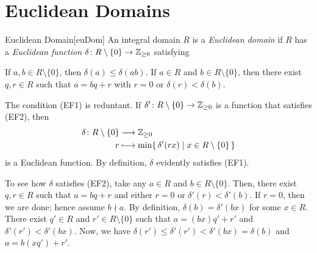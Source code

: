 \documentclass[../modern_algebra_2.tex]{subfiles}
\begin{document}
\section{Euclidean Domains}

\begin{Definition}{Euclidean Domain}[euDom]
    An integral domain \(R\) is a \emph{Euclidean domain} if \(R\) has a \emph{Euclidean function}
    \(\delta \colon R \setminus \{0\} \to \ZZ_{\ge 0}\) satisfying
    \begin{enumerate}[label=(EF\arabic*)]
        \ii
        If \(a, b \in R \setminus \{0\}\), then \(\delta(a) \le \delta(ab)\).
        \ii
        If \(a \in R\) and \(b \in R \setminus \{0\}\), then
        there exist \(q, r \in R\) such that
        \(a = bq + r\) with \(r = 0\) or \(\delta(r) < \delta(b)\).
    \end{enumerate}
\end{Definition}

\begin{note}
    The condition (EF1) is reduntant.
    If \(\delta' \colon R \setminus \{0\} \to \ZZ_{\ge 0}\) is a function that satisfies (EF2),
    then
    \begin{align*}
       \delta \colon R \setminus \{0\} &\longrightarrow \ZZ_{\ge 0} \\
        r &\longmapsto \min \{\,\delta'(rx) \mid x \in R \setminus \{0\}\,\}
    \end{align*}
    is a Euclidean function. By definition, \(\delta\) evidently satisfies (EF1).

    To see how \(\delta\) satisfies (EF2), take any \(a \in R\) and \(b \in R \setminus \{0\}\).
    Then, there exist \(q, r \in R\) such that \(a = bq + r\) and either \(r = 0\) or \(\delta'(r) <
    \delta'(b)\). If \(r = 0\), then we are done; hence assume \(b \nmid a\). By definition,
    \(\delta(b) = \delta'(bx)\) for some \(x \in R\). There exist \(q' \in R\) and \(r' \in R
    \setminus \{0\}\) such that \(a = (bx)q' + r'\) and \(\delta'(r') < \delta'(bx)\). Now, we have
    \(\delta(r') \le \delta'(r') < \delta'(bx) = \delta(b)\) and \(a = b(xq') + r'\).
\end{note}
\end{document}
